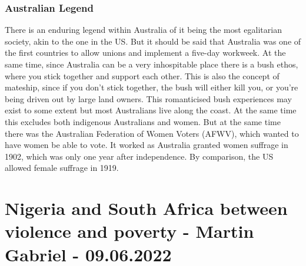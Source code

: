\documentclass{article}
\begin{document}
	\subsubsection{Australian Legend}
	There is an enduring legend within Australia of it being the most egalitarian society, akin to the one in the US. But it should be said that Australia was one of the first countries to allow unions and implement a five-day workweek. At the same time, since Australia can be a very inhospitable place there is a bush ethos, where you stick together and support each other. This is also the concept of mateship, since if you don't stick together, the bush will either kill you, or you're being driven out by large land owners. This romanticised bush experiences may exist to some extent but most Australians live along the coast. At the same time this excludes both indigenous Australians and women. But at the same time there was the Australian Federation of Women Voters (AFWV), which wanted to have women be able to vote. It worked as Australia granted women suffrage in 1902, which was only one year after independence. By comparison, the US allowed female suffrage in 1919.

	\section{Nigeria and South Africa between violence and poverty - Martin Gabriel - 09.06.2022}
\end{document}
